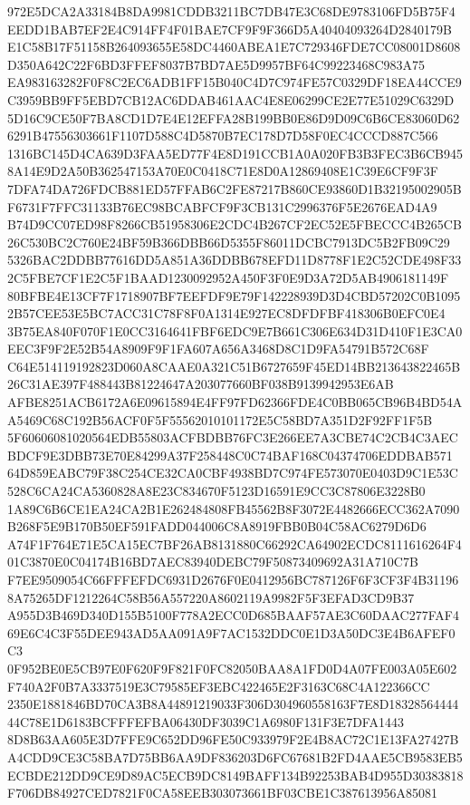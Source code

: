 \documentclass[UTF8,fontset=fandol,zihao=-4,a4paper]{ctexart}
\begin{document}
{{972E5DCA2A33184B8DA9981CDDB3211BC7DB47E3C68DE9783106FD5B75F4EEDD1BAB7EF2E4C914FF4F01BAE7CF9F9F366D5A40404093264D2840179B
E1C58B17F51158B264093655E58DC4460ABEA1E7C729346FDE7CC08001D8608D350A642C22F6BD3FFEF8037B7BD7AE5D9957BF64C99223468C983A75
EA983163282F0F8C2EC6ADB1FF15B040C4D7C974FE57C0329DF18EA44CCE9C3959BB9FF5EBD7CB12AC6DDAB461AAC4E8E06299CE2E77E51029C6329D
5D16C9CE50F7BA8CD1D7E4E12EFFA28B199BB0E86D9D09C6B6CE83060D626291B47556303661F1107D588C4D5870B7EC178D7D58F0EC4CCCD887C566
1316BC145D4CA639D3FAA5ED77F4E8D191CCB1A0A020FB3B3FEC3B6CB9458A14E9D2A50B362547153A70E0C0418C71E8D0A12869408E1C39E6CF9F3F
7DFA74DA726FDCB881ED57FFAB6C2FE87217B860CE93860D1B32195002905BF6731F7FFC31133B76EC98BCABFCF9F3CB131C2996376F5E2676EAD4A9
B74D9CC07ED98F8266CB51958306E2CDC4B267CF2EC52E5FBECCC4B265CB26C530BC2C760E24BF59B366DBB66D5355F86011DCBC7913DC5B2FB09C29
5326BAC2DDBB77616DD5A851A36DDBB678EFD11D8778F1E2C52CDE498F332C5FBE7CF1E2C5F1BAAD1230092952A450F3F0E9D3A72D5AB4906181149F
80BFBE4E13CF7F1718907BF7EEFDF9E79F142228939D3D4CBD57202C0B10952B57CEE53E5BC7ACC31C78F8F0A1314E927EC8DFDFBF418306B0EFC0E4
3B75EA840F070F1E0CC3164641FBF6EDC9E7B661C306E634D31D410F1E3CA0EEC3F9F2E52B54A8909F9F1FA607A656A3468D8C1D9FA54791B572C68F
C64E514119192823D060A8CAAE0A321C51B6727659F45ED14BB213643822465B26C31AE397F488443B81224647A203077660BF038B9139942953E6AB
AFBE8251ACB6172A6E09615894E4FF97FD62366FDE4C0BB065CB96B4BD54AA5469C68C192B56ACF0F5F55562010101172E5C58BD7A351D2F92FF1F5B
5F60606081020564EDB55803ACFBDBB76FC3E266EE7A3CBE74C2CB4C3AECBDCF9E3DBB73E70E84299A37F258448C0C74BAF168C04374706EDDBAB571
64D859EABC79F38C254CE32CA0CBF4938BD7C974FE573070E0403D9C1E53C528C6CA24CA5360828A8E23C834670F5123D16591E9CC3C87806E3228B0
1A89C6B6CE1EA24CA2B1E262484808FB45562B8F3072E4482666ECC362A7090B268F5E9B170B50EF591FADD044006C8A8919FBB0B04C58AC6279D6D6
A74F1F764E71E5CA15EC7BF26AB8131880C66292CA64902ECDC8111616264F401C3870E0C04174B16BD7AEC83940DEBC79F50873409692A31A710C7B
F7EE9509054C66FFFEFDC6931D2676F0E0412956BC787126F6F3CF3F4B311968A75265DF1212264C58B56A557220A8602119A9982F5F3EFAD3CD9B37
A955D3B469D340D155B5100F778A2ECC0D685BAAF57AE3C60DAAC277FAF469E6C4C3F55DEE943AD5AA091A9F7AC1532DDC0E1D3A50DC3E4B6AFEF0C3
0F952BE0E5CB97E0F620F9F821F0FC82050BAA8A1FD0D4A07FE003A05E602F740A2F0B7A3337519E3C79585EF3EBC422465E2F3163C68C4A122366CC
2350E1881846BD70CA3B8A44891219033F306D304960558163F7E8D1832856444444C78E1D6183BCFFFEFBA06430DF3039C1A6980F131F3E7DFA1443
8D8B63AA605E3D7FFE9C652DD96FE50C933979F2E4B8AC72C1E13FA27427BA4CDD9CE3C58BA7D75BB6AA9DF836203D6FC67681B2FD4AAE5CB9583EB5
ECBDE212DD9CE9D89AC5ECB9DC8149BAFF134B92253BAB4D955D30383818F706DB84927CED7821F0CA58EEB303073661BF03CBE1C387613956A85081
}}
\end{document}
